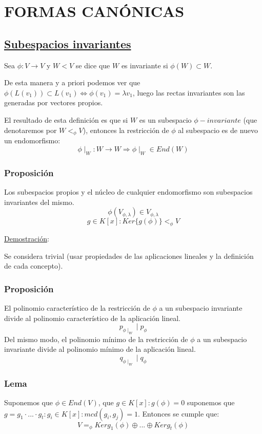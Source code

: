 \documentclass[10pt,a4paper,openright]{book}
\begin{document}
\section*{FORMAS CANÓNICAS}
\subsection*{\underline{Subespacios invariantes}}
Sea $\phi: V\rightarrow V$ y $W<V$ se dice que $W$ es invariante si $\phi(W)\subset W$.

De esta manera y a priori podemos ver que $\phi(L(v_1))\subset L(v_1)\Leftrightarrow \phi(v_1)=\lambda v_1$, luego las rectas invariantes son las generadas por vectores propios.

El resultado de esta definición es que si $W$ es un subespacio $\phi-invariante$ (que denotaremos por $W<_\phi V$), entonces la restricción de $\phi$ al subespacio es de nuevo un endomorfismo:
$$\phi\mid_W: W\rightarrow W\Rightarrow \phi\mid_W\in End(W)$$

\subsubsection*{Proposición}
Los subespacios propios y el núcleo de cualquier endomorfismo son subespacios invariantes del mismo.
$$\phi\left(V_{\phi,\lambda}\right)\in V_{\phi,\lambda}$$
$$g\in K[x]: Ker\{g(\phi)\}<_\phi V$$

\underline{Demostración}:

Se considera trivial (usar propiedades de las aplicaciones lineales y la definición de cada concepto).

\subsubsection*{Proposición}
El polinomio característico de la restricción de $\phi$ a un subespacio invariante divide al polinomio característico de la aplicación lineal.
$$p_{\phi\mid_W}\mid p_\phi$$
Del mismo modo, el polinomio mínimo de la restricción de $\phi$ a un subespacio invariante divide al polinomio mínimo de la aplicación lineal.
$$q_{\phi\mid_W}\mid q_\phi$$

\subsubsection*{Lema}
Suponemos que $\phi\in End(V)$, que $g\in K[x]: g(\phi)=0$ suponemos que $g=g_1\cdot ... \cdot g_t: g_i\in K[x]: mcd(g_i, g_j)=1$. Entonces se cumple que:
$$V=_\phi Ker g_1(\phi)\oplus ... \oplus Ker g_t(\phi)$$
\end{document}
